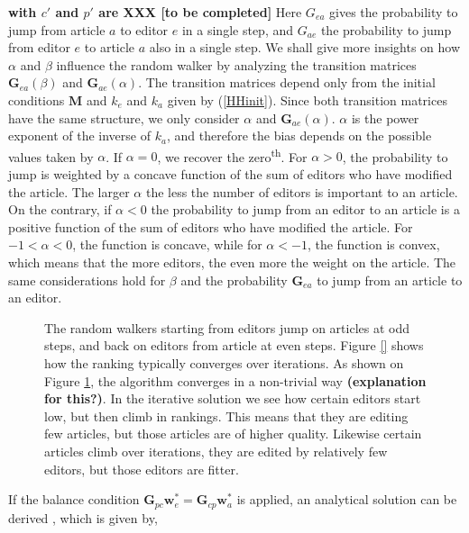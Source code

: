 {\bf with $c'$ and $p'$ are XXX [to be completed]} Here $G_{ea}$ gives the probability to jump from article $a$ to editor $e$ in a single step, and $G_{ae}$ the probability to jump from editor $e$ to article $a$ also in a single step. We shall give more insights on how $\alpha$ and $\beta$ influence the random walker by analyzing the transition matrices $\mathbf{G}_{ea}(\beta)$ and $\mathbf{G}_{ae}(\alpha)$. The transition matrices depend only from the initial conditions $\mathbf{M}$ and $k_e$ and $k_a$ given by (\ref{HHinit}). Since both transition matrices have the same structure, we only consider $\alpha$  and $\mathbf{G}_{ae}(\alpha)$. $\alpha$ is the power exponent of the inverse of $k_a$, and therefore the bias depends on the possible values taken by $\alpha$. If $\alpha = 0$, we recover the zero\textsuperscript{th}. For $\alpha > 0$, the probability to jump is weighted by a concave function of the sum of editors who have modified the article. The larger $\alpha$ the less the number of editors is important to an article. On the contrary, if $\alpha < 0$ the probability to jump from an editor to an article is a positive function of the sum of editors who have modified the article. For $-1 < \alpha < 0$, the function is concave, while for $\alpha < -1$, the function is convex, which means that the more editors, the even more the weight on the article. The same considerations hold for $\beta$ and the probability $\mathbf{G}_{ea}$ to jump from an article to an editor. 

\begin{figure}[!t]
\centering
\caption{The random walkers starting from editors jump on articles at odd steps, and back on editors from article at even steps. Figure \ref{} shows how the ranking typically converges over iterations. As shown on Figure \ref{fig:convergence}, the algorithm converges in a non-trivial way {\bf (explanation for this?)}. In the iterative solution we see how certain editors start low, but then climb in rankings. This means that they are editing few articles, but those articles are of higher quality. Likewise certain articles climb over iterations, they are edited by relatively few editors, but those editors are fitter.
}
\label{fig:convergence}
\end{figure}

If the balance condition $\mathbf{G}_{pc} \mathbf{w}^*_e = \mathbf{G}_{cp} \mathbf{w}^*_a$
is applied, an analytical solution can be derived \cite{caldarelli}, which is given by,

